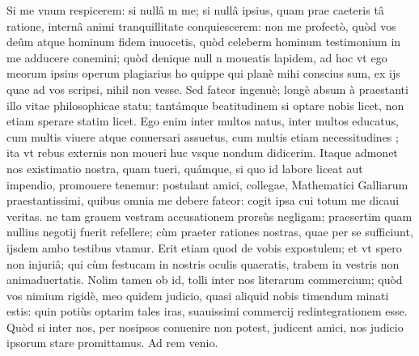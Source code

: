 \documentclass[11pt,a4paper]{article}
\begin{document}
Si me vnum respicerem: si nullâ \ill{} \ill{}m me; si nullâ ipsius, quam prae caeteris \ill{} \ill{}tâ ratione, internâ animi tranquillitate conquiescerem: non me\ill{} \ill{} profectò, quòd vos deûm atque hominum fidem inuocetis, quòd celeber\ill{}m hominum testimonium in me adducere conemini; quòd denique null\ill{} \ill{}n moueatis lapidem, ad hoc vt ego meorum ipsius operum plagiarius ho\ill{} quippe qui planè mihi conscius sum, ex ijs quae ad vos scripsi, nihil non ve\ill{}sse. Sed fateor ingenuè; longè absum à praestanti illo vitae philosophicae statu; tantámque beatitudinem si optare nobis licet, non etiam sperare statim licet. Ego enim inter multos natus, inter multos educatus, cum multis viuere atque conuersari assuetus, cum multis etiam necessitudines ; ita vt rebus externis non moueri huc vsque nondum didicerim. Itaque admonet nos existimatio nostra, quam tueri, quámque, si quo id labore liceat aut impendio, promouere tenemur: postulant amici, collegae, Mathematici Galliarum praestantissimi, quibus omnia me debere fateor: cogit ipsa cui totum me dicaui veritas. ne tam grauem vestram accusationem prorsùs negligam; praesertim quam nullius negotij fuerit refellere; cùm praeter rationes nostras, quae per se sufficiunt, ijsdem ambo testibus vtamur. Erit etiam quod de vobis expostulem; et vt spero non injuriâ; qui cùm festucam in nostris oculis quaeratis, trabem in vestris non animaduertatis. Nolim tamen ob id, tolli inter nos literarum commercium; quòd vos nimium rigidè, meo quidem judicio, quasi aliquid nobis timendum minati estis: quin potiùs optarim tales iras, suauissimi commercij redintegrationem esse. Quòd si inter nos, per nosipsos conuenire non potest, judicent amici, nos judicio ipsorum stare promittamus. Ad rem venio.
\end{document}
